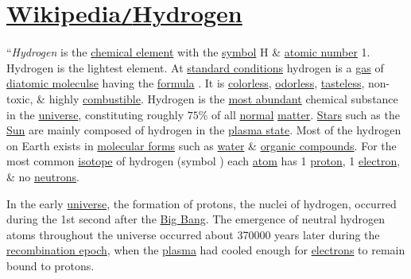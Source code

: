 \documentclass{article}
\begin{document}
\section{\href{https://en.wikipedia.org/wiki/Hydrogen}{Wikipedia\texttt{/}Hydrogen}}
``\textit{Hydrogen} is the \href{https://en.wikipedia.org/wiki/Chemical_element}{chemical element} with the \href{https://en.wikipedia.org/wiki/Symbol_(chemistry)}{symbol} H \& \href{https://en.wikipedia.org/wiki/Atomic_number}{atomic number} 1. Hydrogen is the lightest element. At \href{https://en.wikipedia.org/wiki/Standard_temperature_and_pressure}{standard conditions} hydrogen is a \href{https://en.wikipedia.org/wiki/Gas}{gas} of \href{https://en.wikipedia.org/wiki/Diatomic_molecule}{diatomic moleculse} having the \href{https://en.wikipedia.org/wiki/Chemical_formula}{formula} . It is \href{https://en.wikipedia.org/wiki/Transparency_(optics)}{colorless}, \href{https://en.wikipedia.org/wiki/Sense_of_smell}{odorless}, \href{https://en.wikipedia.org/wiki/Taste}{tasteless}, non-toxic, \& highly \href{https://en.wikipedia.org/wiki/Combustible}{combustible}. Hydrogen is the \href{https://en.wikipedia.org/wiki/Abundance_of_the_chemical_elements}{most abundant} chemical substance in the \href{https://en.wikipedia.org/wiki/Universe}{universe}, constituting roughly $75$\% of all \href{https://en.wikipedia.org/wiki/Baryon}{normal} \href{https://en.wikipedia.org/wiki/Matter}{matter}. \href{https://en.wikipedia.org/wiki/Star}{Stars} such as the \href{https://en.wikipedia.org/wiki/Sun}{Sun} are mainly composed of hydrogen in the \href{https://en.wikipedia.org/wiki/Plasma_state}{plasma state}. Most of the hydrogen on Earth exists in \href{https://en.wikipedia.org/wiki/Molecular_geometry}{molecular forms} such as \href{https://en.wikipedia.org/wiki/Water}{water} \& \href{https://en.wikipedia.org/wiki/Organic_compound}{organic compounds}. For the most common \href{https://en.wikipedia.org/wiki/Isotope}{isotope} of hydrogen (symbol ) each \href{https://en.wikipedia.org/wiki/Atom}{atom} has 1 \href{https://en.wikipedia.org/wiki/Proton}{proton}, 1 \href{https://en.wikipedia.org/wiki/Electron}{electron}, \& no \href{https://en.wikipedia.org/wiki/Neutron}{neutrons}.

In the early \href{https://en.wikipedia.org/wiki/Universe}{universe}, the formation of protons, the nuclei of hydrogen, occurred during the 1st second after the \href{https://en.wikipedia.org/wiki/Big_Bang}{Big Bang}. The emergence of neutral hydrogen atoms throughout the universe occurred about 370000 years later during the \href{https://en.wikipedia.org/wiki/Recombination_(cosmology)}{recombination epoch}, when the \href{https://en.wikipedia.org/wiki/Plasma_(physics)}{plasma} had cooled enough for \href{https://en.wikipedia.org/wiki/Electrons}{electrons} to remain bound to protons.
\end{document}
